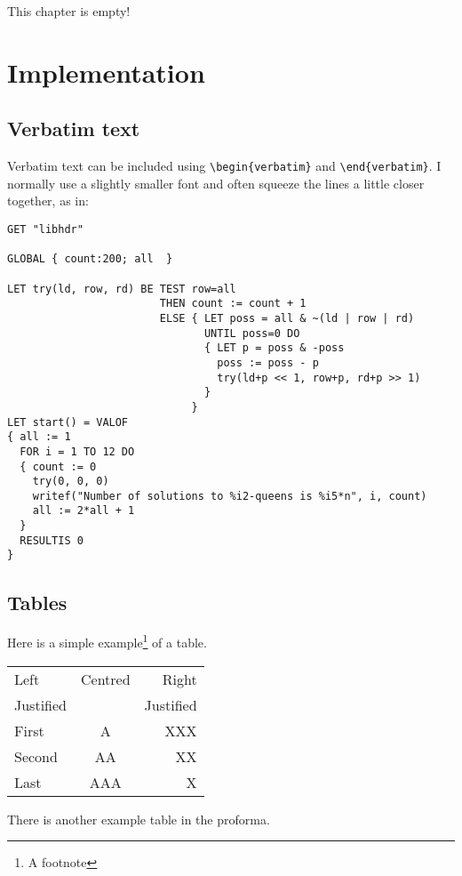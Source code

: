 \documentclass[12pt,a4paper,twoside,openright, hidelinks]{report}
\renewcommand{\baselinestretch}{1.1}    %
\begin{document}
This chapter is empty!


\chapter{Implementation}

\section{Verbatim text}

Verbatim text can be included using \verb|\begin{verbatim}| and
\verb|\end{verbatim}|. I normally use a slightly smaller font and
often squeeze the lines a little closer together, as in:

{\renewcommand{\baselinestretch}{0.8}\small
\begin{verbatim}
GET "libhdr"
 
GLOBAL { count:200; all  }
 
LET try(ld, row, rd) BE TEST row=all
                        THEN count := count + 1
                        ELSE { LET poss = all & ~(ld | row | rd)
                               UNTIL poss=0 DO
                               { LET p = poss & -poss
                                 poss := poss - p
                                 try(ld+p << 1, row+p, rd+p >> 1)
                               }
                             }
LET start() = VALOF
{ all := 1
  FOR i = 1 TO 12 DO
  { count := 0
    try(0, 0, 0)
    writef("Number of solutions to %i2-queens is %i5*n", i, count)
    all := 2*all + 1
  }
  RESULTIS 0
}
\end{verbatim}
}

\section{Tables}

\begin{samepage}
Here is a simple example\footnote{A footnote} of a table.

\begin{center}
\begin{tabular}{l|c|r}
Left      & Centred & Right \\
Justified &         & Justified \\[3mm]
First     & A       & XXX \\
Second    & AA      & XX  \\
Last      & AAA     & X   \\
\end{tabular}
\end{center}

\noindent
There is another example table in the proforma.
\end{samepage}
\end{document}
